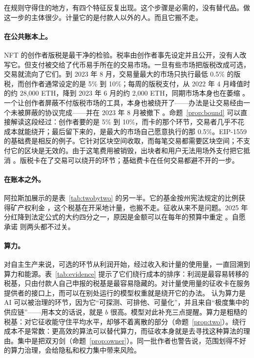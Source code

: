 在规则守得住的地方，有四个特征反复出现。这个步骤是必需的，没有替代品。做这一步的主体很少。计量它的是付款人以外的人。而且它搬不走。

\paragraph{在公共账本上。} NFT 的创作者版税是最干净的检验。税率由创作者事先设定并且公开，没有人改写它。但支付被交给了代币易手所在的交易市场。一旦有些市场把版税改成可选，交易就流向了它们。到 2023 年 8 月，交易量最大的市场只执行最低 0.5\% 的版税，而创作者通常设定的是 5\% 到 10\%；每周的版税支付，从 2022 年 4 月峰值时的约 28{,}000 ETH，降到 2023 年
6 月的约 2{,}000 ETH，同期市场本身也在萎缩 \citep{Akers2023}。一个让创作者屏蔽不付版税市场的工具，本身也被绕开了——办法是让交易经由一个未被屏蔽的协议完成——并在 2023 年 8 月被撤下 \citep{Lindrea2023}。命题~\ref{prop:bound} 可以直接解读这段经过：创作者要的是
5\% 到 10\%，而卡的那个环节，交易者几乎不花成本就能绕开；最后留下来的，是最大的市场自己愿意执行的那 0.5\%。EIP-1559 的基础费是相反的例子。它针对区块空间收取，而每笔交易都需要区块空间；不支付它的区块是无效的。由于这笔费用被销毁，出块者和用户无法用场外支付把它抵消 \citep{Roughgarden2021}。版税卡在了交易可以绕开的环节；基础费卡在任何交易都避不开的一步。

\paragraph{在账本之外。} 阿拉斯加展示的是表~\ref{tab:twobytwo} 的另一半。它的基金按州宪法规定的比例获得矿产权利金 \citep{APFC2026}，这个税基在开采地计量，也搬不走。征收从来不是问题。2025 年分红降到法定公式的大约四分之一，原因是金额可以在每年的预算中重定
\citep{Wielechowski2017,AlaskaPublic2025}。自愿承诺 \citep{OKeefe2020} 则两头都不过关。

\paragraph{算力。} 对自主生产来说，可选的环节从利润开始，经过收入和计量的使用量，一直回溯到算力和能源。表~\ref{tab:evidence} 提示了它们绕行成本的排序：利润是最容易转移的税基，只由付款人自己申报的税基是最容易隐藏的。对计量使用量的征收卡在服务提供者的接口上，而可以在别处运行的模型权重就是绕开它的办法。\citet{SastryEtAl2024} 认为算力是 AI 可以被治理的环节，因为它“可探测、可排他、可量化”，并且来自“极度集中的供应链”——用本文的话说，就是
$b$ 很高。模型对此补充三点提醒。算力是粗糙的税基：对它征收能守住平均水平，却够不着离散的部分（命题~\ref{prop:two}）。绕行成本不是常数：更高效的算法可以替代算力，而征收本身就是去寻找这种算法的理由。集中是把双刃剑（命题~\ref{prop:owner}）。同一批作者也警告说，范围划得不好的算力治理，会给隐私和权力集中带来风险。


